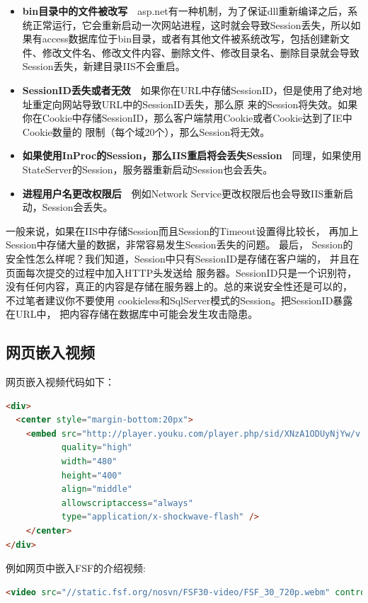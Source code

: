 \documentclass{book}
\begin{document}
\begin{itemize}
\item{\textbf{bin目录中的文件被改写}}~~asp.net有一种机制，为了保证dll重新编译之后，系统正常运行，它会重新启动一次网站进程，这时就会导致Session丢失，所以如果有access数据库位于bin目录，或者有其他文件被系统改写，包括创建新文件、修改文件名、修改文件内容、删除文件、修改目录名、删除目录就会导致Session丢失，新建目录IIS不会重启。
\item{\textbf{SessionID丢失或者无效}}~~如果你在URL中存储SessionID，但是使用了绝对地址重定向网站导致URL中的SessionID丢失，那么原 来的Session将失效。如果你在Cookie中存储SessionID，那么客户端禁用Cookie或者Cookie达到了IE中Cookie数量的 限制（每个域20个），那么Session将无效。
\item{\textbf{如果使用InProc的Session，那么IIS重启将会丢失Session}}~~同理，如果使用StateServer的Session，服务器重新启动Session也会丢失。
\item{\textbf{进程用户名更改权限后}}~~例如Network Service更改权限后也会导致IIS重新启动，Session会丢失。
\end{itemize}

一般来说，如果在IIS中存储Session而且Session的Timeout设置得比较长，
再加上Session中存储大量的数据，非常容易发生Session丢失的问题。
最后， Session的安全性怎么样呢？我们知道，Session中只有SessionID是存储在客户端的，
并且在页面每次提交的过程中加入HTTP头发送给 服务器。SessionID只是一个识别符，
没有任何内容，真正的内容是存储在服务器上的。总的来说安全性还是可以的，
不过笔者建议你不要使用 cookieless和SqlServer模式的Session。把SessionID暴露在URL中，
把内容存储在数据库中可能会发生攻击隐患。

\subsection{网页嵌入视频}

网页嵌入视频代码如下：

\begin{lstlisting}[language=HTML]
<div>
  <center style="margin-bottom:20px">
    <embed src="http://player.youku.com/player.php/sid/XNzA1ODUyNjYw/v.swf" allowfullscreen="true"
           quality="high" 
           width="480" 
           height="400" 
           align="middle" 
           allowscriptaccess="always" 
           type="application/x-shockwave-flash" />
    </center>        
</div>
\end{lstlisting}

例如网页中嵌入FSF的介绍视频: 

\begin{lstlisting}[language=HTML]
<video src="//static.fsf.org/nosvn/FSF30-video/FSF_30_720p.webm" controls width="640" height="390"></video>
\end{lstlisting}
\end{document}
